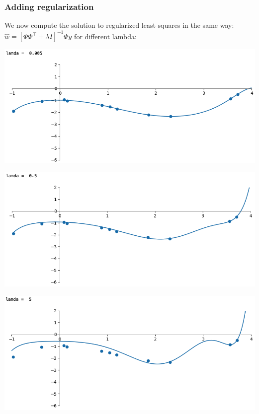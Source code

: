 \documentclass[10pt,aspectratio=169,handout]{beamer}
\begin{document}
\begin{frame}
    \frametitle{Adding regularization}

    We now compute the solution to regularized least squares in the same way: $\hat{w}=[\Phi\Phi^\intercal+\lambda I]^{-1}\Phi y$ for different lambda:\newline
    \begin{minipage}{0.32\textwidth}
        \includegraphics[width=\textwidth]{images/task5-1-3_l0005.png}
    \end{minipage}
    \begin{minipage}{0.32\textwidth}
        \includegraphics[width=\textwidth]{images/task5-1-3_l05.png}
    \end{minipage}
    \begin{minipage}{0.32\textwidth}
        \includegraphics[width=\textwidth]{images/task5-1-3_l5.png}
    \end{minipage}
\end{frame}
\end{document}
